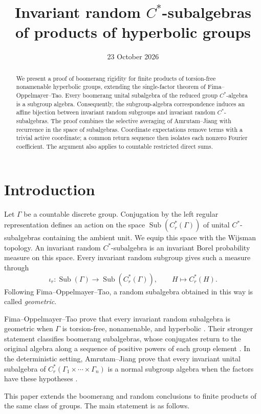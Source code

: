 \documentclass[11pt,letterpaper]{amsart}
\title[Random $C^*$-subalgebras of products]{Invariant random $C^*$-subalgebras\\
of products of hyperbolic groups}
\date{23 October 2026}
\numberwithin{equation}{section}
\theoremstyle{definition}
\theoremstyle{remark}
\newcommand{\Cr}{C_r^*}
\newcommand{\Sub}{\operatorname{Sub}}
\begin{document}
\begin{abstract}
We present a proof of boomerang rigidity for finite products of
torsion-free nonamenable hyperbolic groups, extending the single-factor
theorem of Fima--Oppelmayer--Tao. Every boomerang unital subalgebra of
the reduced group $C^*$-algebra is a subgroup algebra. Consequently,
the subgroup-algebra correspondence induces an affine bijection
between invariant random subgroups and invariant random
$C^*$-subalgebras. The proof combines the selective averaging of
Amrutam--Jiang with recurrence in the space of subalgebras.
Coordinate expectations remove terms with a trivial active coordinate;
a common return sequence then isolates each nonzero Fourier
coefficient. The argument also applies to countable restricted direct
sums.
\end{abstract}
\maketitle

\section{Introduction}

Let $\Gamma$ be a countable discrete group. Conjugation by the left
regular representation defines an action on the space
$\Sub(\Cr(\Gamma))$ of unital $C^*$-subalgebras containing the ambient
unit. We equip this space with the Wijsman topology.
An invariant random $C^*$-subalgebra is an invariant Borel probability
measure on this space. Every invariant random subgroup gives such a
measure through
\[
 \iota_r:\Sub(\Gamma)\longrightarrow\Sub(\Cr(\Gamma)),
 \qquad H\longmapsto\Cr(H).
\]
Following Fima--Oppelmayer--Tao, a random subalgebra obtained in this
way is called \emph{geometric}.

Fima--Oppelmayer--Tao prove that every invariant random subalgebra is
geometric when $\Gamma$ is torsion-free, nonamenable, and hyperbolic
\cite[Corollary~6.9]{FOT}. Their stronger statement classifies
boomerang subalgebras, whose conjugates return to the original algebra
along a sequence of positive powers of each group element
\cite[Theorem~6.8]{FOT}. In the deterministic setting,
Amrutam--Jiang prove that every invariant unital subalgebra of
$\Cr(\Gamma_1\times\cdots\times\Gamma_n)$ is a normal subgroup algebra
when the factors have these hypotheses \cite[Theorem~5.4]{AJ}.

This paper extends the boomerang and random conclusions to finite
products of the same class of groups. The main statement is as follows.
\end{document}
